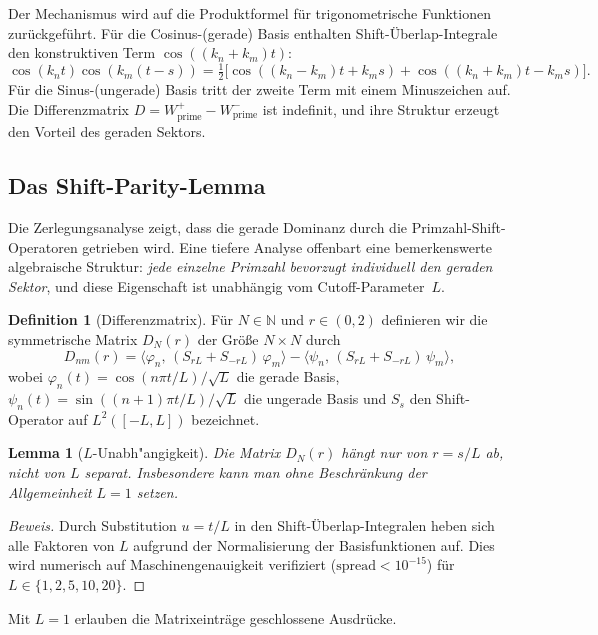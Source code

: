 ﻿\documentclass[12pt,a4paper]{article}
\newtheorem{lemma}[theorem]{Lemma}
\theoremstyle{definition}
\newtheorem{definition}[theorem]{Definition}
\theoremstyle{remark}
\begin{document}
Der Mechanismus wird auf die Produktformel für trigonometrische Funktionen zurückgeführt. Für die Cosinus-(gerade) Basis enthalten Shift-Überlap-Integrale den konstruktiven Term $\cos((k_n + k_m)t)$:
\[
  \cos(k_n t)\cos(k_m(t-s)) = \tfrac{1}{2}\bigl[\cos((k_n-k_m)t + k_m s) + \cos((k_n+k_m)t - k_m s)\bigr].
\]
Für die Sinus-(ungerade) Basis tritt der zweite Term mit einem Minuszeichen auf. Die Differenzmatrix $D = W_{\mathrm{prime}}^+ - W_{\mathrm{prime}}^-$ ist indefinit, und ihre Struktur erzeugt den Vorteil des geraden Sektors.

\subsection{Das Shift-Parity-Lemma}
\label{sec:shift-parity}

Die Zerlegungsanalyse zeigt, dass die gerade Dominanz durch die Primzahl-Shift-Operatoren getrieben wird. Eine tiefere Analyse offenbart eine bemerkenswerte algebraische Struktur: \emph{jede einzelne Primzahl bevorzugt individuell den geraden Sektor}, und diese Eigenschaft ist unabhängig vom Cutoff-Parameter~$L$.

\begin{definition}[Differenzmatrix]
\label{def:D-matrix}
Für $N \in \mathbb{N}$ und $r \in (0,2)$ definieren wir die symmetrische Matrix $D_N(r)$ der Größe $N \times N$ durch
\[
  D_{nm}(r) = \langle \varphi_n,\, (S_{rL} + S_{-rL})\,\varphi_m \rangle
            - \langle \psi_n,\, (S_{rL} + S_{-rL})\,\psi_m \rangle,
\]
wobei $\varphi_n(t) = \cos(n\pi t/L)/\sqrt{L}$ die gerade Basis, $\psi_n(t) = \sin((n+1)\pi t/L)/\sqrt{L}$ die ungerade Basis und $S_s$ den Shift-Operator auf $L^2([-L,L])$ bezeichnet.
\end{definition}

\begin{lemma}[$L$-Unabh"angigkeit]
\label{lem:L-indep}
Die Matrix $D_N(r)$ hängt nur von $r = s/L$ ab, nicht von $L$ separat. Insbesondere kann man ohne Beschränkung der Allgemeinheit $L = 1$ setzen.
\end{lemma}

\begin{proof}[Beweis]
Durch Substitution $u = t/L$ in den Shift-Überlap-Integralen heben sich alle Faktoren von $L$ aufgrund der Normalisierung der Basisfunktionen auf. Dies wird numerisch auf Maschinengenauigkeit verifiziert ($\text{spread} < 10^{-15}$) für $L \in \{1, 2, 5, 10, 20\}$.
\end{proof}

Mit $L=1$ erlauben die Matrixeinträge geschlossene Ausdrücke.
\end{document}
